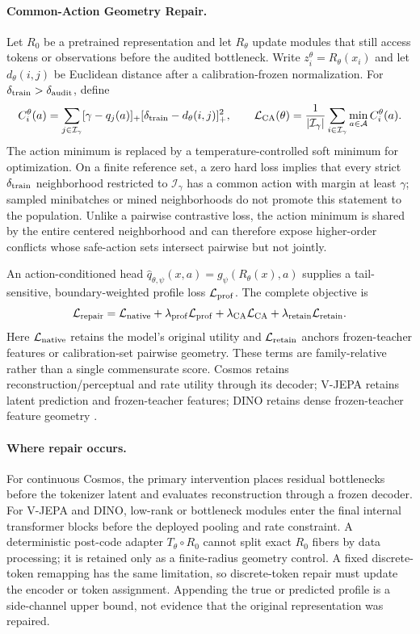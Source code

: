 \paragraph{Common-Action Geometry Repair.}
Let $R_0$ be a pretrained representation and let $R_\theta$ update modules that still access tokens
or observations before the audited bottleneck.  Write $z_i^\theta=R_\theta(x_i)$ and let
$d_\theta(i,j)$ be Euclidean distance after a calibration-frozen normalization.  For
$\delta_{\rm train}>\delta_{\rm audit}$, define
\[
 C_i^\theta(a)=
 \sum_{j\in\mathcal I_\gamma}
 [\gamma-q_j(a)]_+
 [\delta_{\rm train}-d_\theta(i,j)]_+^2,
 \qquad
 \mathcal L_{\rm CA}(\theta)
 =\frac{1}{|\mathcal I_\gamma|}
 \sum_{i\in\mathcal I_\gamma}\min_{a\in\mathcal A} C_i^\theta(a).
\]
The action minimum is replaced by a temperature-controlled soft minimum for optimization.  On a
finite reference set, a zero hard loss implies that every strict
$\delta_{\rm train}$ neighborhood restricted to $\mathcal I_\gamma$ has a common action with margin
at least $\gamma$; sampled
minibatches or mined neighborhoods do not promote this statement to the population.  Unlike a
pairwise contrastive loss, the action minimum is shared by the entire centered neighborhood and can
therefore expose higher-order conflicts whose safe-action sets intersect pairwise but not jointly.

An action-conditioned head
$\widehat q_{\theta,\psi}(x,a)=g_\psi(R_\theta(x),a)$ supplies a tail-sensitive, boundary-weighted
profile loss $\mathcal L_{\rm prof}$.  The complete objective is
\[
 \mathcal L_{\rm repair}
 =\mathcal L_{\rm native}
 +\lambda_{\rm prof}\mathcal L_{\rm prof}
 +\lambda_{\rm CA}\mathcal L_{\rm CA}
 +\lambda_{\rm retain}\mathcal L_{\rm retain}.
\]
Here $\mathcal L_{\rm native}$ retains the model's original utility and
$\mathcal L_{\rm retain}$ anchors frozen-teacher features or calibration-set pairwise geometry.
These terms are family-relative rather than a single commensurate score.  Cosmos retains
reconstruction/perceptual and rate utility through its decoder; V-JEPA retains latent prediction
and frozen-teacher features; DINO retains dense frozen-teacher feature geometry
\citep{nvidia2025cosmostokenizer,assran2025vjepa2,simeoni2025dinov3}.

\paragraph{Where repair occurs.}
For continuous Cosmos, the primary intervention places residual bottlenecks before the tokenizer
latent and evaluates reconstruction through a frozen decoder.  For V-JEPA and DINO, low-rank or
bottleneck modules enter the final internal transformer blocks before the deployed pooling and
rate constraint.  A deterministic post-code adapter $T_\theta\circ R_0$ cannot split exact
$R_0$ fibers by data processing; it is retained only as a finite-radius geometry control.  A fixed
discrete-token remapping has the same limitation, so discrete-token repair must update the encoder
or token assignment.  Appending the true or predicted profile is a side-channel upper bound, not
evidence that the original representation was repaired.

